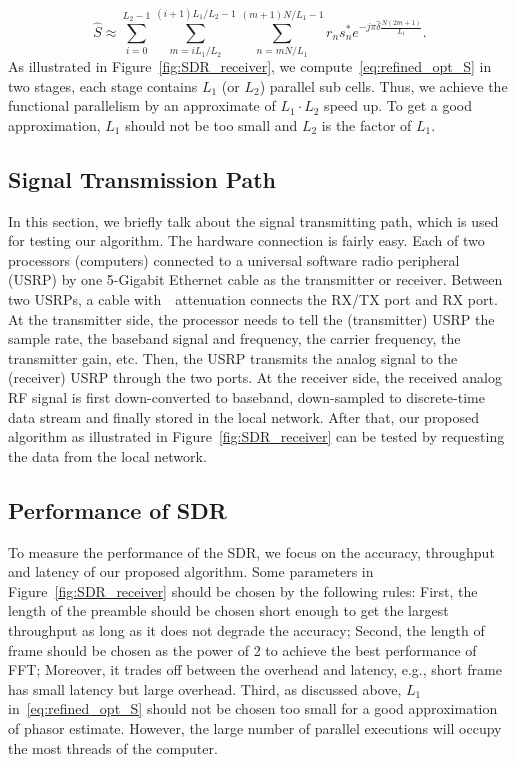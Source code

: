 \begin{equation}
    \label{eq:refined_opt_S}
    \hat{S} \approx \sum_{i=0}^{L_2-1} \sum_{m=iL_1/L_2}^{(i+1)L_1/L_2-1}
    \sum_{n=mN/L_1}^{(m+1)N/L_1-1}r_ns_n^* 
    e^{-j\pi \hat{\delta}\frac{N(2m+1)}{L_1}}.
  \end{equation}
As illustrated in Figure~\ref{fig:SDR_receiver}, we compute~\eqref{eq:refined_opt_S} in two stages, each
stage contains $L_1$ (or $L_2$) parallel sub cells. 
Thus, we achieve the functional parallelism by an approximate of $L_1 \cdot L_2$ speed up.
To get a good approximation, $L_1$ should not be too small and 
$L_2$ is the factor of $L_1$.

\subsection{Signal Transmission Path}

In this section, we briefly talk about the signal transmitting path, which is used 
for testing our algorithm. The hardware connection is fairly easy. 
Each of two processors (computers) connected to a universal software radio peripheral (USRP) 
by one 5-Gigabit Ethernet cable as the transmitter or receiver. Between two USRPs,
a cable with~\dB~attenuation connects the RX/TX port and RX port.
At the transmitter side, the processor needs to tell the (transmitter) USRP the sample rate, 
the baseband signal and frequency, the carrier frequency, the transmitter gain, etc. 
Then, the USRP transmits the analog signal to the (receiver) USRP through the two ports.
At the receiver side, the received analog RF signal is first down-converted to baseband, down-sampled to 
discrete-time data stream and finally stored in the local network. After that, our proposed algorithm as illustrated
in Figure~\ref{fig:SDR_receiver} can be tested by requesting the data from the local network.

\subsection{Performance of SDR}

To measure the performance of the SDR, we focus on the accuracy, throughput and latency of our proposed algorithm.
Some parameters in Figure~\ref{fig:SDR_receiver} should be chosen by the following rules:
First, the length of the preamble should be chosen short enough to get the largest throughput as long as it does not degrade the accuracy;
Second, the length of frame should be chosen as the power of 2 to achieve the best performance of FFT; Moreover, 
it trades off between the overhead and latency, e.g., short frame has small latency but large overhead. 
Third, as discussed above, $L_1$ in~\eqref{eq:refined_opt_S} should not be chosen too small for a good approximation of phasor estimate. However, the large number of 
parallel executions will occupy the most threads of the computer.

